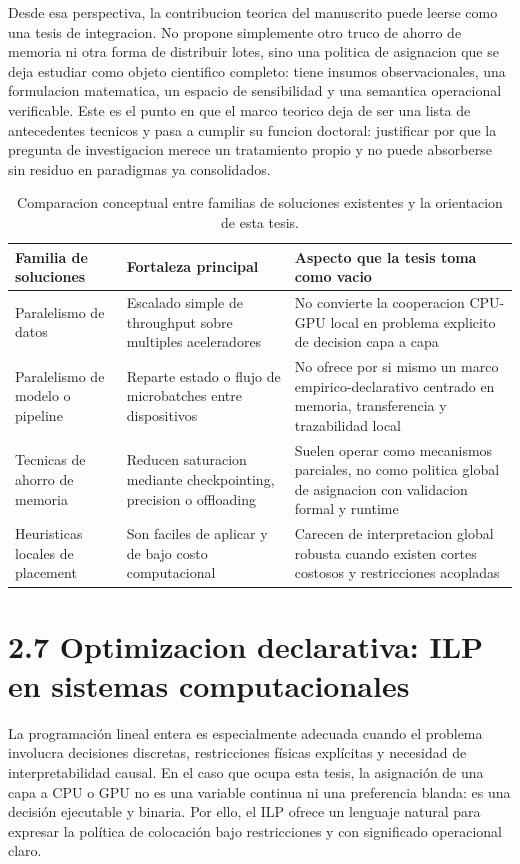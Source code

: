 Desde esa perspectiva, la contribucion teorica del manuscrito puede leerse como una tesis de integracion. No propone simplemente otro truco de ahorro de memoria ni otra forma de distribuir lotes, sino una politica de asignacion que se deja estudiar como objeto cientifico completo: tiene insumos observacionales, una formulacion matematica, un espacio de sensibilidad y una semantica operacional verificable. Este es el punto en que el marco teorico deja de ser una lista de antecedentes tecnicos y pasa a cumplir su funcion doctoral: justificar por que la pregunta de investigacion merece un tratamiento propio y no puede absorberse sin residuo en paradigmas ya consolidados.

\begin{table}[t]
\centering
\caption{Comparacion conceptual entre familias de soluciones existentes y la orientacion de esta tesis.}
\label{tab:comparison-existing-solutions}
\small
\begin{tabularx}{\textwidth}{lXX}
\toprule
Familia de soluciones & Fortaleza principal & Aspecto que la tesis toma como vacio \\
\midrule
Paralelismo de datos & Escalado simple de throughput sobre multiples aceleradores & No convierte la cooperacion CPU-GPU local en problema explicito de decision capa a capa \\
Paralelismo de modelo o pipeline & Reparte estado o flujo de microbatches entre dispositivos & No ofrece por si mismo un marco empirico-declarativo centrado en memoria, transferencia y trazabilidad local \\
Tecnicas de ahorro de memoria & Reducen saturacion mediante checkpointing, precision o offloading & Suelen operar como mecanismos parciales, no como politica global de asignacion con validacion formal y runtime \\
Heuristicas locales de placement & Son faciles de aplicar y de bajo costo computacional & Carecen de interpretacion global robusta cuando existen cortes costosos y restricciones acopladas \\
\bottomrule
\end{tabularx}
\normalsize
\end{table}

\section{2.7 Optimizacion declarativa: ILP en sistemas computacionales}
La programación lineal entera es especialmente adecuada cuando el problema involucra decisiones discretas, restricciones físicas explícitas y necesidad de interpretabilidad causal. En el caso que ocupa esta tesis, la asignación de una capa a CPU o GPU no es una variable continua ni una preferencia blanda: es una decisión ejecutable y binaria. Por ello, el ILP ofrece un lenguaje natural para expresar la política de colocación bajo restricciones y con significado operacional claro.

